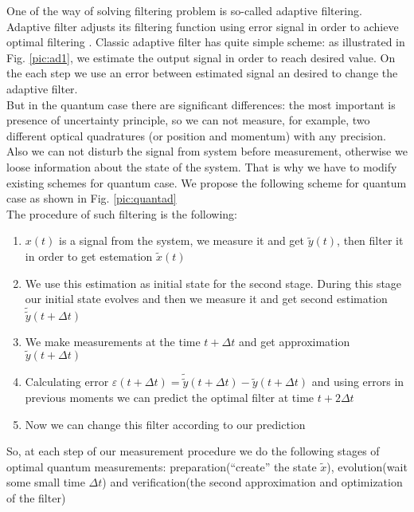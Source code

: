 One of the way of solving filtering problem is so-called adaptive filtering. Adaptive filter adjusts its filtering function using error signal in order to achieve optimal filtering \cite{Farhang-Boroujeny1998,Sastry1989,Haykin2003,Drumright1998,Nationale1991,Huzmezan2002}.
Classic adaptive filter has quite simple scheme: as illustrated in Fig. \ref{pic:ad1}, we estimate the output signal in order to reach desired value. On the each step we use an error between estimated signal an desired to change the adaptive filter.
\\
But in the quantum case there are significant differences: the most important is presence of uncertainty principle, so we can not measure, for example, two different optical quadratures (or position and momentum) with any precision. Also we can not disturb the signal from system before measurement, otherwise we loose information about the state of the system.
That is why we have to modify existing schemes for quantum case.
We propose the following scheme for quantum case as shown in Fig. \ref{pic:quantad}\\

The procedure of such filtering is the following:
\begin{enumerate}
 \item $x(t)$ is a signal from the system, we measure it and get $\tilde{y}(t)$, then filter it in order to get estemation $\tilde{x}(t)$
 \item We use this estimation as initial state for the second stage. During this stage our initial state evolves and then we measure it and get second estimation $\tilde{\tilde{y}}(t+\varDelta t)$
 \item We make measurements at the time $t+\varDelta t$ and get approximation $\tilde{y}(t+\varDelta t)$
 \item Calculating error $\varepsilon(t+\varDelta t) = \tilde{\tilde{y}}(t+\varDelta t) - \tilde{y}(t+\varDelta t)$  and using errors in previous moments we can predict the optimal filter at time $t+2 \varDelta t$
 \item Now we can change this filter according to our prediction
\end{enumerate}

So, at each step of our measurement procedure we do the following stages of optimal quantum measurements: preparation(``create'' the state $\tilde{x}$)\cite{Rehbein2009m}, evolution(wait some small time $\varDelta t$) and verification(the second approximation and optimization of the filter)\cite{Miao}


